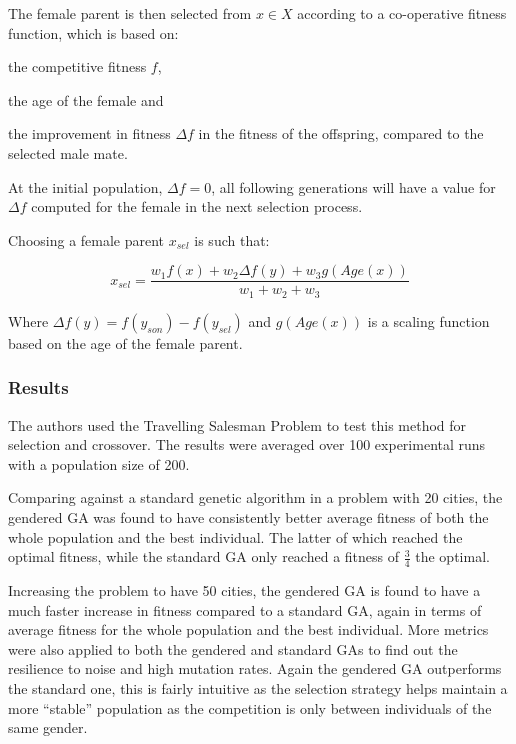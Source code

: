 \documentclass[10pt, a4paper]{article}
\begin{document}
The female parent is then selected from $x \in X$ according to a co-operative
fitness function, which is based on:
\begin{inparaenum}[a\upshape)]
\item the competitive fitness $f$,
\item the age of the female and
\item the improvement in fitness $\Delta f$ in the fitness of the offspring,
      compared to the selected male mate.
\end{inparaenum}

At the initial population, $\Delta f = 0$, all following generations will have a
value for $\Delta f$ computed for the female in the next selection process.

Choosing a female parent $x_{sel}$ is such that:

\begin{equation}
x_{sel} = \frac{w_1 f(x) + w_2 \Delta f(y) + w_3 g(Age(x))}{w_1 + w_2 + w_3}
\end{equation}

Where $\Delta f(y) = f(y_{son}) - f(y_{sel})$ and $g(Age(x))$ is a scaling
function based on the age of the female parent.


\subsubsection{Results}
The authors used the Travelling Salesman Problem to test this method for
selection and crossover. The results were averaged over 100 experimental runs
with a population size of 200.

Comparing against a standard genetic algorithm in a problem with 20 cities, the
gendered GA was found to have consistently better average fitness of both the
whole population and the best individual. The latter of which reached the
optimal fitness, while the standard GA only reached a fitness of $\frac{3}{4}$
the optimal.

Increasing the problem to have 50 cities, the gendered GA is found to have a
much faster increase in fitness compared to a standard GA, again in terms of
average fitness for the whole population and the best individual. More metrics
were also applied to both the gendered and standard GAs to find out the
resilience to noise and high mutation rates. Again the gendered GA outperforms
the standard one, this is fairly intuitive as the selection strategy helps
maintain a more ``stable'' population as the competition is only between
individuals of the same gender.
\end{document}
